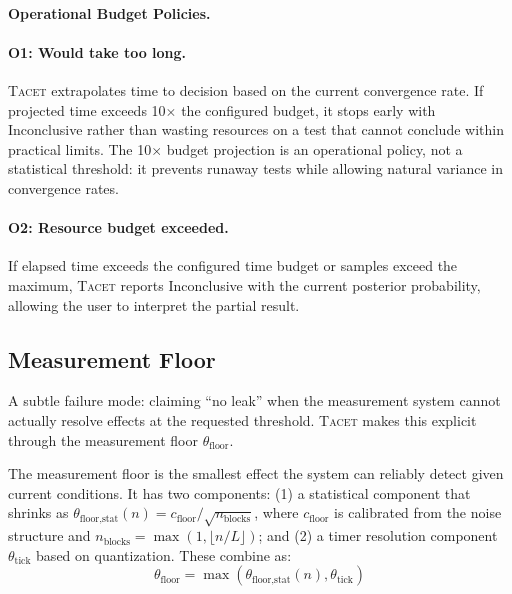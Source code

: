 \documentclass[letterpaper,twocolumn,10pt]{article}
\newcommand{\tacet}{\textsc{Tacet}\xspace}
\begin{document}
\paragraph{Operational Budget Policies.}

\paragraph{O1: Would take too long.}
\tacet extrapolates time to decision based on the current convergence rate. If
projected time exceeds 10$\times$ the configured budget, it stops early with
Inconclusive rather than wasting resources on a test that cannot conclude within
practical limits. The 10$\times$ budget projection is an operational policy, not
a statistical threshold: it prevents runaway tests while allowing natural variance
in convergence rates.

\paragraph{O2: Resource budget exceeded.}
If elapsed time exceeds the configured time budget or samples exceed the maximum,
\tacet reports Inconclusive with the current posterior probability, allowing the
user to interpret the partial result.

\subsection{Measurement Floor}
\label{sec:approach:floor}

A subtle failure mode: claiming ``no leak'' when the measurement system cannot
actually resolve effects at the requested threshold. \tacet makes this explicit
through the measurement floor $\theta_{\text{floor}}$.

The measurement floor is the smallest effect the system can reliably detect given
current conditions. It has two components: (1) a statistical component that shrinks
as $\theta_{\text{floor,stat}}(n) = c_{\text{floor}} / \sqrt{n_{\text{blocks}}}$,
where $c_{\text{floor}}$ is calibrated from the noise structure and $n_{\text{blocks}} = \max(1, \lfloor n/L \rfloor)$; and (2) a timer
resolution component $\theta_{\text{tick}}$ based on quantization. These combine as:
\begin{equation}
    \theta_{\text{floor}} = \max(\theta_{\text{floor,stat}}(n), \theta_{\text{tick}})
\end{equation}
\end{document}
